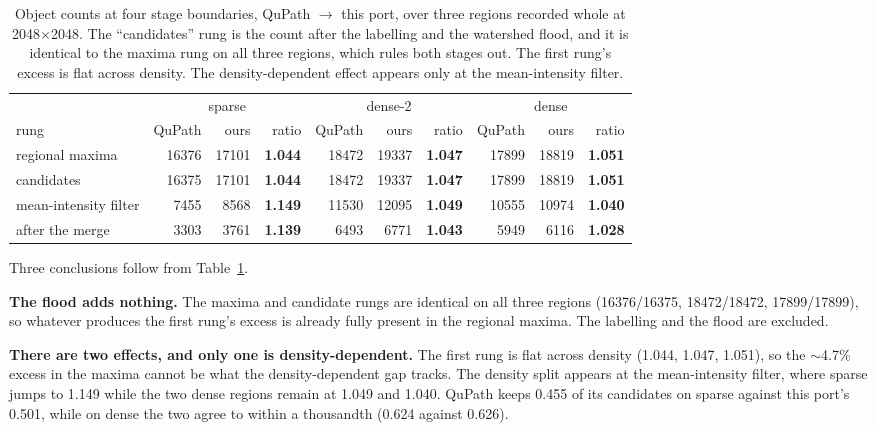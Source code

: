 \documentclass[11pt,a4paper]{article}
\begin{document}
\begin{table}[t]
  \centering
  \caption{Object counts at four stage boundaries, QuPath $\rightarrow$ this
           port, over three regions recorded whole at 2048$\times$2048. The
           ``candidates'' rung is the count after the labelling and the
           watershed flood, and it is identical to the maxima rung on all three
           regions, which rules both stages out. The first rung's excess is
           flat across density. The density-dependent effect appears only at
           the mean-intensity filter.}
  \label{tab:ladder}
  \small
  \setlength{\tabcolsep}{4pt}
  \begin{tabular}{lrrrrrrrrr}
    \toprule
    & \multicolumn{3}{c}{sparse} & \multicolumn{3}{c}{dense-2}
    & \multicolumn{3}{c}{dense} \\
    \cmidrule(lr){2-4}\cmidrule(lr){5-7}\cmidrule(lr){8-10}
    rung & QuPath & ours & ratio & QuPath & ours & ratio
         & QuPath & ours & ratio \\
    \midrule
    regional maxima     & 16376 & 17101 & \textbf{1.044}
                        & 18472 & 19337 & \textbf{1.047}
                        & 17899 & 18819 & \textbf{1.051} \\
    candidates          & 16375 & 17101 & \textbf{1.044}
                        & 18472 & 19337 & \textbf{1.047}
                        & 17899 & 18819 & \textbf{1.051} \\
    mean-intensity filter & 7455 & 8568 & \textbf{1.149}
                        & 11530 & 12095 & \textbf{1.049}
                        & 10555 & 10974 & \textbf{1.040} \\
    after the merge     & 3303 & 3761 & \textbf{1.139}
                        & 6493 & 6771 & \textbf{1.043}
                        & 5949 & 6116 & \textbf{1.028} \\
    \bottomrule
  \end{tabular}
\end{table}

Three conclusions follow from Table~\ref{tab:ladder}.

\textbf{The flood adds nothing.} The maxima and candidate rungs are identical on
all three regions (16376/16375, 18472/18472, 17899/17899), so whatever produces
the first rung's excess is already fully present in the regional maxima. The
labelling and the flood are excluded.

\textbf{There are two effects, and only one is density-dependent.} The first
rung is flat across density (1.044, 1.047, 1.051), so the $\sim$4.7\% excess in
the maxima cannot be what the density-dependent gap tracks. The density split
appears at the mean-intensity filter, where sparse jumps to 1.149 while the two
dense regions remain at 1.049 and 1.040. QuPath keeps 0.455 of its candidates
on sparse against this port's 0.501, while on dense the two agree to within a
thousandth (0.624 against 0.626).
\end{document}
